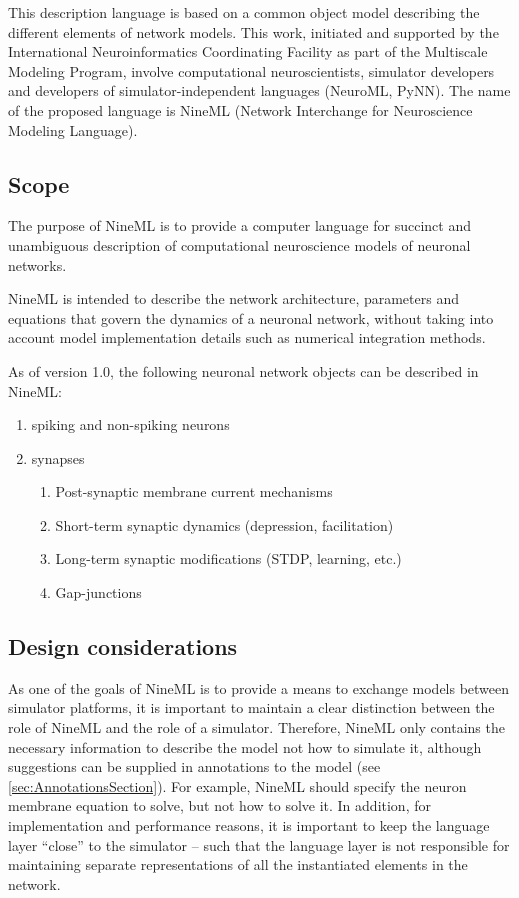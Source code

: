 \documentclass[draftspec]{ninemlspec}
\begin{document}
This description language is based on a
common object model describing the different elements of network
models. This work, initiated and supported by the International
Neuroinformatics Coordinating Facility as part of the Multiscale Modeling
Program, involve computational neuroscientists, simulator developers and
developers of simulator-independent languages (NeuroML, PyNN).  The name of the
proposed language is NineML (Network Interchange for Neuroscience Modeling
Language).

\subsection{Scope}

The purpose of NineML is to provide a computer language for
succinct and unambiguous description of computational neuroscience models of neuronal networks.

NineML is intended to describe the network architecture, parameters
and equations that govern the dynamics of a neuronal network, without
taking into account model implementation details such as numerical integration
methods.

As of version 1.0, the following neuronal
network objects can be described in NineML:
\begin{enumerate}
\item spiking and non-spiking neurons
\item synapses
\begin{enumerate}
\item Post-synaptic membrane current mechanisms
\item Short-term synaptic dynamics (depression, facilitation)
\item Long-term synaptic modifications (STDP, learning, etc.)
\item Gap-junctions
\end{enumerate}
\end{enumerate}

\subsection{Design considerations}
\label{sec:design_considerations}

As one of the goals of NineML is to provide a means to exchange models between simulator platforms, 
it is important to maintain a clear distinction
between the role of NineML and the role of a simulator. Therefore, NineML only
contains the necessary information to describe the model
not how to simulate it, although suggestions can be supplied in annotations to the model (see \ref{sec:AnnotationsSection}). 
For example, NineML should specify the neuron membrane equation to solve,
but not how to solve it.  In addition, for implementation and performance
reasons, it is important to keep the language layer ``close'' to the simulator
-- such that the language layer is not responsible for maintaining separate
representations of all the instantiated elements in the network.
\end{document}
